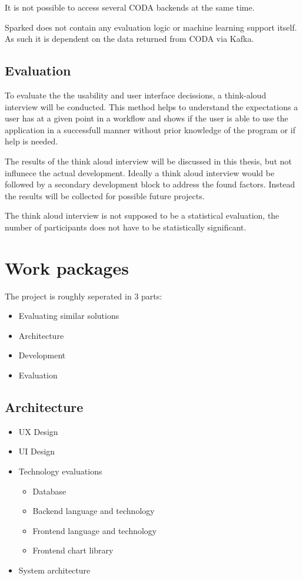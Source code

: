 \documentclass[12pt,a4paper,titlepage,oneside,BCOR1cm]{scrreprt}
\begin{document}
It is not possible to access several CODA backends at the same time. 

Sparked does not contain any evaluation logic or machine learning support itself. As such it is dependent on the data returned from CODA via Kafka.

\section{Evaluation}

To evaluate the the usability and user interface decissions, a think-aloud interview will be conducted. This method helps to understand the expectations a user has at a given point in a workflow and shows if the user is able to use the application in a successfull manner without prior knowledge of the program or if help is needed.

The results of the think aloud interview will be discussed in this thesis, but not influnece the actual development. Ideally a think aloud interview would be followed by a secondary development block to address the found factors. Instead the results will be collected for possible future projects.

The think aloud interview is not supposed to be a statistical evaluation, the number of participants does not have to be statistically significant. 

\chapter{Work packages}

The project is roughly seperated in 3 parts:
\begin{itemize}
  \item Evaluating similar solutions
  \item Architecture
  \item Development
  \item Evaluation
\end{itemize}


\section{Architecture}
\begin{itemize}
  \item UX Design
  \item UI Design
  \item Technology evaluations
  
  \begin{itemize}
    \item Database
    \item Backend language and technology
    \item Frontend language and technology
    \item Frontend chart library
  \end{itemize}  
  \item System architecture
\end{itemize}  
\end{document}
